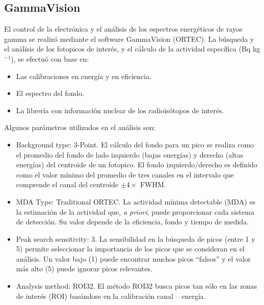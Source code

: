 		\subsection{GammaVision}\label{SubSec-GammaVision}
El control de la electrónica y el análisis de los espectros energéticos de rayos gamma se realizó mediante el software GammaVision (ORTEC). La búsqueda y el análisis de los fotopicos de interés, y el cálculo de la actividad específica (Bq kg$^{-1}$), se efectuó con base en:
\begin{itemize}
\item Las calibraciones en energía y en eficiencia. 
\item El espectro del fondo.
\item La librería con información nuclear de los radioisótopos de interés. 
\end{itemize}
Algunos parámetros utilizados en el análisis son: \cite{GammaVisionManual}
\begin{itemize}
\item Background type: 3-Point. El cálculo del fondo para un pico se realiza como el promedio del fondo de lado izquierdo (bajas energías) y derecho (altas energías) del centroide de un fotopico. El fondo izquierdo/derecho es definido como el valor mínimo del promedio de tres canales en el intervalo que comprende el canal del centroide $\pm 4\times$ FWHM.
\item MDA Type: Traditional ORTEC. La actividad mínima detectable (MDA) es la estimación de la actividad que, \textit{a priori}, puede proporcionar cada sistema de detección. Su valor depende de la eficiencia, fondo y tiempo de medida. 
\item Peak search sensitivity: 3. La sensibilidad en la búsqueda de picos (entre 1 y 5) permite seleccionar la importancia de los picos que se consideran en el análisis. Un valor bajo (1) puede encontrar muchos picos “falsos” y el valor más alto (5) puede ignorar picos relevantes. 
\item Analysis method: ROI32. El método ROI32 busca picos tan sólo en las zonas de interés (ROI) basándose en la calibración canal – energía. 
\end{itemize} 
\newpage
\newpage
